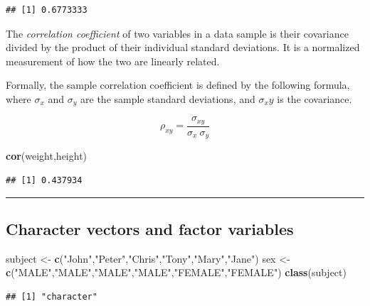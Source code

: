 \documentclass[]{article}
\newenvironment{Shaded}{\begin{snugshade}}{\end{snugshade}}
\newcommand{\KeywordTok}[1]{\textcolor[rgb]{0.13,0.29,0.53}{\textbf{{#1}}}}
\newcommand{\StringTok}[1]{\textcolor[rgb]{0.31,0.60,0.02}{{#1}}}
\newcommand{\NormalTok}[1]{{#1}}
\numberwithin{equation}{section}
\begin{document}
\begin{verbatim}
## [1] 0.6773333
\end{verbatim}

The \emph{correlation coefficient} of two variables in a data sample is
their covariance divided by the product of their individual standard
deviations. It is a normalized measurement of how the two are linearly
related.

Formally, the sample correlation coefficient is defined by the following
formula, where \(\sigma_x\) and \(\sigma_y\) are the sample standard
deviations, and \(\sigma_xy\) is the covariance.

\[
      \rho_{xy}  = \frac{\sigma_{xy}}{\sigma_x~\sigma_y}
\]

\begin{Shaded}
\begin{Highlighting}[]
\KeywordTok{cor}\NormalTok{(weight,height)}
\end{Highlighting}
\end{Shaded}

\begin{verbatim}
## [1] 0.437934
\end{verbatim}

\begin{center}\rule{0.5\linewidth}{\linethickness}\end{center}

\subsection{Character vectors and factor
variables}\label{character-vectors-and-factor-variables}

\begin{Shaded}
\begin{Highlighting}[]
\NormalTok{subject <-}\StringTok{ }\KeywordTok{c}\NormalTok{(}\StringTok{"John"}\NormalTok{,}\StringTok{"Peter"}\NormalTok{,}\StringTok{"Chris"}\NormalTok{,}\StringTok{"Tony"}\NormalTok{,}\StringTok{"Mary"}\NormalTok{,}\StringTok{"Jane"}\NormalTok{)}
\NormalTok{sex <-}\StringTok{ }\KeywordTok{c}\NormalTok{(}\StringTok{"MALE"}\NormalTok{,}\StringTok{"MALE"}\NormalTok{,}\StringTok{"MALE"}\NormalTok{,}\StringTok{"MALE"}\NormalTok{,}\StringTok{"FEMALE"}\NormalTok{,}\StringTok{"FEMALE"}\NormalTok{)}
\KeywordTok{class}\NormalTok{(subject)}
\end{Highlighting}
\end{Shaded}

\begin{verbatim}
## [1] "character"
\end{verbatim}
\end{document}
